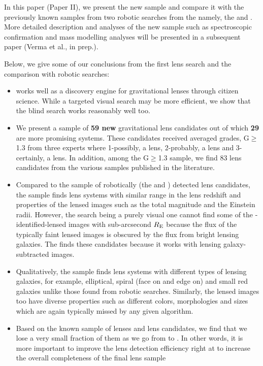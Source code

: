 \documentclass[useAMS,usenatbib,a4paper]{mn2e}
\begin{document}
In this paper (Paper II), we present the new \sw sample and compare it
with the previously known samples from two robotic searches from the
\cfhtls namely, the \rf and \af. More detailed description and analyses
of the new sample such as spectroscopic confirmation and mass modelling
analyses will be presented in a subsequent \sw paper (Verma et al., in
prep.). 

Below, we give some of our conclusions from the first \sw lens search
and the comparison with robotic searches:
\begin{itemize}

\item \sw works well as a discovery engine for gravitational lenses
through citizen science. While a targeted visual search may be more
efficient, we show that the blind search works reasonably well too.

\item We present a sample of {\bf 59 new} gravitational lens candidates
out of which {\bf 29} are more promising systems. These candidates received
averaged grades, G$\ge$1.3 from three experts where 1-possibly, a lens,
2-probably, a lens and 3-certainly, a lens. In addition, among the
G$\ge$1.3 sample, we find 83 lens candidates from the various samples
published in the literature.

\item Compared to the sample of robotically (the \rf and \af) detected
lens candidates, the \sw sample finds lens systems with similar range in
the lens redshift and properties of the lensed images such as the total
magnitude and the Einstein radii. However, the \sw search being a purely
visual one cannot find some of the \rf-identified-lensed images with
sub-arcsecond $R_{\rm E}$ because the flux of the typically faint
lensed images is obscured by the flux from bright lensing galaxies. The
\rf finds these candidates because it works with lensing
galaxy-subtracted images.

\item Qualitatively, the \sw sample finds lens systems with different
types of lensing galaxies, for example, elliptical, spiral (face on and
edge on) and small red galaxies unlike those found from robotic
searches. Similarly, the lensed images too have diverse properties such
as different colors, morphologies and sizes which are again typically
missed by any given algorithm.

\item Based on the known sample of lenses and lens candidates, we find
that we lose a very small fraction of them as we go from \StageOne to
\StageTwo. In other words, it is more important to improve the lens
detection efficiency right at \StageOne to increase the overall
completeness of the final lens sample


\end{itemize}
\end{document}
